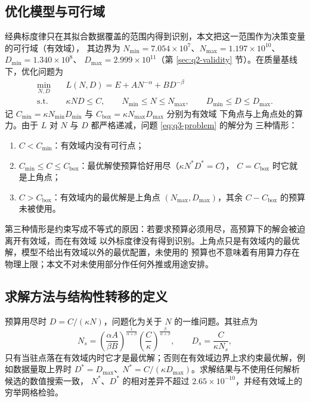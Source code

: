 \subsection{优化模型与可行域}

经典标度律只在其拟合数据覆盖的范围内得到识别，本文把这一范围作为决策变量的可行域（有效域），
其边界为 $N_{\min}=7.054\times10^{7}$、$N_{\max}=1.197\times10^{10}$、$D_{\min}=1.340\times10^{8}$、
$D_{\max}=2.999\times10^{11}$（第 \ref{sec:q2-validity} 节）。在质量基线下，优化问题为
\begin{equation}
  \begin{aligned}
    \min_{N,D}\quad & L(N,D)=E+A N^{-\alpha}+B D^{-\beta}\\
    \text{s.t.}\quad & \kappa N D\le C,\qquad N_{\min}\le N\le N_{\max},\qquad D_{\min}\le D\le D_{\max}.
  \end{aligned}
  \label{eq:q3-problem}
\end{equation}
记 $C_{\min}=\kappa N_{\min}D_{\min}$ 与 $C_{\mathrm{box}}=\kappa N_{\max}D_{\max}$ 分别为有效域
下角点与上角点处的算力。由于 $L$ 对 $N$ 与 $D$ 都严格递减，问题 \eqref{eq:q3-problem} 的解分为
三种情形：
\begin{enumerate}
  \item $C<C_{\min}$：有效域内没有可行点；
  \item $C_{\min}\le C\le C_{\mathrm{box}}$：最优解使预算恰好用尽（$\kappa N^*D^*=C$），
        $C=C_{\mathrm{box}}$ 时它就是上角点；
  \item $C>C_{\mathrm{box}}$：有效域内的最优解是上角点 $(N_{\max},D_{\max})$，其余
        $C-C_{\mathrm{box}}$ 的预算未被使用。
\end{enumerate}
第三种情形是约束写成不等式的原因：若要求预算必须用尽，高预算下的解会被迫离开有效域，而在有效域
以外标度律没有得到识别。上角点只是有效域内的最优解，模型不给出有效域以外的最优配置，未使用的
预算也不意味着有用算力存在物理上限；本文不对未使用部分作任何外推或用途安排。

\subsection{求解方法与结构性转移的定义}

预算用尽时 $D=C/(\kappa N)$，问题化为关于 $N$ 的一维问题。其驻点为
\begin{equation}
  N_s=\left(\frac{\alpha A}{\beta B}\right)^{\frac{1}{\alpha+\beta}}
      \left(\frac{C}{\kappa}\right)^{\frac{\beta}{\alpha+\beta}},\qquad
  D_s=\frac{C}{\kappa N_s},
  \label{eq:q3-stationary}
\end{equation}
只有当驻点落在有效域内时它才是最优解；否则在有效域边界上求约束最优解，例如数据量取上界时
$D^*=D_{\max}$、$N^*=C/(\kappa D_{\max})$。求解结果与不使用任何解析候选的数值搜索一致，
$N^*$、$D^*$ 的相对差异不超过 $2.65\times10^{-10}$，并经有效域上的穷举网格检验。

